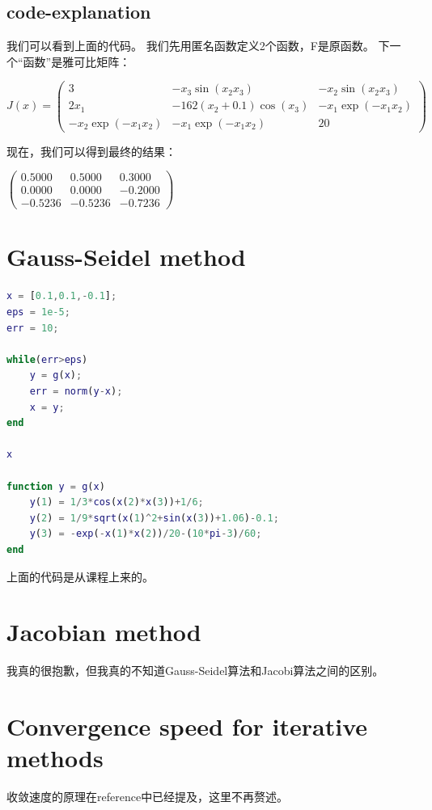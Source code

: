 \documentclass[12pt, a4paper, oneside]{ctexart}
\begin{document}
\begin{spacing}{2.0}
\subsection{code-explanation}
我们可以看到上面的代码。 我们先用匿名函数定义2个函数，F是原函数。
下一个“函数”是雅可比矩阵：
\begin{center}
    $J(x) = \begin{pmatrix}
        3 & -x_{3}\sin{(x_{2}x_{3})} & -x_{2}\sin{(x_{2}x_{3})} \\
        2x_{1} & -162(x_{2} + 0.1)\cos(x_{3}) & -x_{1}\exp{(-x_{1}x_{2})} \\
        -x_{2}\exp{(-x_{1}x_{2})} & -x_{1}\exp{(-x_{1}x_{2})} & 20
        \end{pmatrix}
        $
\end{center}
现在，我们可以得到最终的结果：
\begin{center}
$    \begin{pmatrix}
        0.5000 & 0.5000 & 0.3000 \\
        0.0000 & 0.0000 & -0.2000 \\
        -0.5236 & -0.5236 & -0.7236
        \end{pmatrix}
$        
\end{center}


\section{Gauss-Seidel method}

\begin{lstlisting}[language=Matlab, caption=Newton-Raphson method]
x = [0.1,0.1,-0.1];
eps = 1e-5;
err = 10;

while(err>eps)
    y = g(x);
    err = norm(y-x);
    x = y;
end

x

function y = g(x)
    y(1) = 1/3*cos(x(2)*x(3))+1/6;
    y(2) = 1/9*sqrt(x(1)^2+sin(x(3))+1.06)-0.1;
    y(3) = -exp(-x(1)*x(2))/20-(10*pi-3)/60;
end

\end{lstlisting}

上面的代码是从课程上来的。

\section{Jacobian method}
我真的很抱歉，但我真的不知道Gauss-Seidel算法和Jacobi算法之间的区别。
\section{Convergence speed for iterative methods}
收敛速度的原理在reference\cite{key1}中已经提及，这里不再赘述。

\end{spacing}
\end{document}
